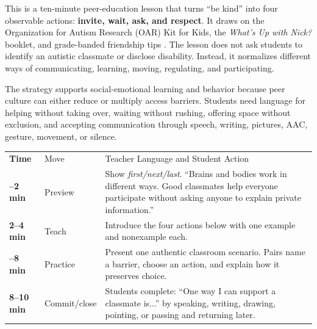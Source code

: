 

This is a ten-minute peer-education lesson that turns ``be kind'' into four observable actions: \textbf{invite, wait, ask, and respect}. It draws on the Organization for Autism Research (OAR) Kit for Kids, the \textit{What's Up with Nick?} booklet, and grade-banded friendship tips \citep{oar2026kit,oar2026nick,oar2026tips}. The lesson does not ask students to identify an autistic classmate or disclose disability. Instead, it normalizes different ways of communicating, learning, moving, regulating, and participating.

The strategy supports social-emotional learning and behavior because peer culture can either reduce or multiply access barriers. Students need language for helping without taking over, waiting without rushing, offering space without exclusion, and accepting communication through speech, writing, pictures, AAC, gesture, movement, or silence.


\small
\renewcommand{\arraystretch}{1.15}
\setlength{\tabcolsep}{5pt}
\begin{tabularx}{\textwidth}{>{\bfseries\RaggedRight\arraybackslash}p{0.75in} >{\RaggedRight\arraybackslash}p{1.60in} >{\RaggedRight\arraybackslash}X}
\rowcolor{PrimaryRed}
\color{white}Time & \color{white}Move & \color{white}Teacher Language and Student Action \\
0--2 min & Preview & Show \textit{first/next/last}. ``Brains and bodies work in different ways. Good classmates help everyone participate without asking anyone to explain private information.'' \\
\rowcolor{SoftGray}
2--4 min & Teach & Introduce the four actions below with one example and nonexample each. \\
4--8 min & Practice & Present one authentic classroom scenario. Pairs name a barrier, choose an action, and explain how it preserves choice. \\
\rowcolor{SoftGray}
8--10 min & Commit/close & Students complete: ``One way I can support a classmate is...'' by speaking, writing, drawing, pointing, or passing and returning later. \\
\end{tabularx}
\normalsize

